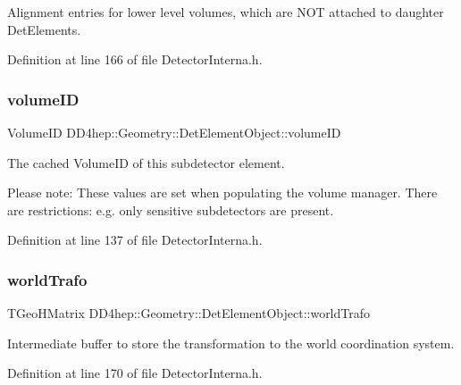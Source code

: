 Alignment entries for lower level volumes, which are N\+OT attached to daughter Det\+Elements. 



Definition at line 166 of file Detector\+Interna.\+h.

\hypertarget{class_d_d4hep_1_1_geometry_1_1_det_element_object_a276f203e5b02da612f42450767bf9756}{}\label{class_d_d4hep_1_1_geometry_1_1_det_element_object_a276f203e5b02da612f42450767bf9756} 
\subsubsection{\texorpdfstring{volume\+ID}{volumeID}}
{\footnotesize\ttfamily Volume\+ID D\+D4hep\+::\+Geometry\+::\+Det\+Element\+Object\+::volume\+ID}



The cached Volume\+ID of this subdetector element. 

Please note\+: These values are set when populating the volume manager. There are restrictions\+: e.\+g. only sensitive subdetectors are present. 

Definition at line 137 of file Detector\+Interna.\+h.

\hypertarget{class_d_d4hep_1_1_geometry_1_1_det_element_object_ae6ff583186272de915842f8fb9603590}{}\label{class_d_d4hep_1_1_geometry_1_1_det_element_object_ae6ff583186272de915842f8fb9603590} 
\subsubsection{\texorpdfstring{world\+Trafo}{worldTrafo}}
{\footnotesize\ttfamily T\+Geo\+H\+Matrix D\+D4hep\+::\+Geometry\+::\+Det\+Element\+Object\+::world\+Trafo}



Intermediate buffer to store the transformation to the world coordination system. 



Definition at line 170 of file Detector\+Interna.\+h.



